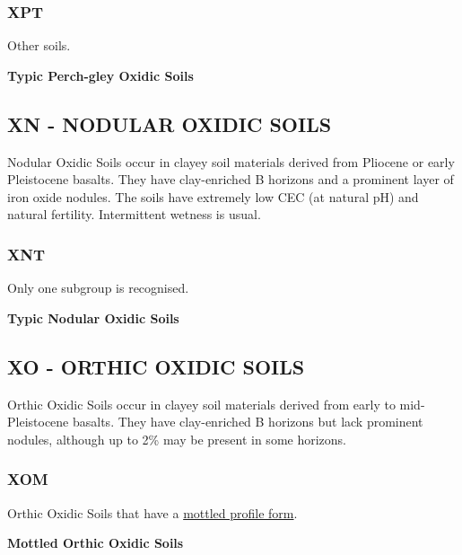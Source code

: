 \documentclass[
  letterpaper,
  DIV=11,
  numbers=noendperiod]{scrreprt}
\begin{document}
\hypertarget{sec-key-XPT}{%
\subsubsection{\texorpdfstring{\textbf{XPT}}{XPT}}\label{sec-key-XPT}}

Other soils.

\textbf{Typic Perch-gley Oxidic Soils}

\hypertarget{sec-XN}{%
\subsection{\texorpdfstring{\textbf{XN} - NODULAR OXIDIC
SOILS}{XN - NODULAR OXIDIC SOILS}}\label{sec-XN}}

Nodular Oxidic Soils occur in clayey soil materials derived from
Pliocene or early Pleistocene basalts. They have clay-enriched B
horizons and a prominent layer of iron oxide nodules. The soils have
extremely low CEC (at natural pH) and natural fertility. Intermittent
wetness is usual.

\hypertarget{sec-key-XNT}{%
\subsubsection{\texorpdfstring{\textbf{XNT}}{XNT}}\label{sec-key-XNT}}

Only one subgroup is recognised.

\textbf{Typic Nodular Oxidic Soils}

\hypertarget{sec-XO}{%
\subsection{\texorpdfstring{\textbf{XO} - ORTHIC OXIDIC
SOILS}{XO - ORTHIC OXIDIC SOILS}}\label{sec-XO}}

Orthic Oxidic Soils occur in clayey soil materials derived from early to
mid-Pleistocene basalts. They have clay-enriched B horizons but lack
prominent nodules, although up to 2\% may be present in some horizons.

\hypertarget{sec-key-XOM}{%
\subsubsection{\texorpdfstring{\textbf{XOM}}{XOM}}\label{sec-key-XOM}}

Orthic Oxidic Soils that have a
\protect\hyperlink{sec-diag-mottpf}{mottled profile form}.

\textbf{Mottled Orthic Oxidic Soils}
\end{document}
